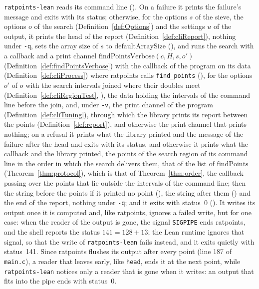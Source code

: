 \begin{definition}\label{def:cliRun}
  \leanok
  \verb|ratpoints-lean| reads its command line (). On a failure it prints
  the failure's message and exits with its status; otherwise, for the options $s$ of the sieve, the
  options $o$ of the search (Definition~\ref{def:Options}) and the settings $u$ of the output, it
  prints the head of the report (Definition~\ref{def:cliReport}), nothing under \verb|-q|, sets the
  array size of $s$ to $\mathrm{defaultArraySize}$ (), and runs the search
  with a callback and a print channel $\mathrm{findPointsVerbose}(c, H, s, o')$
  (Definition~\ref{def:findPointsVerbose}) with the callback of the program on its data
  (Definition~\ref{def:cliProcess}) where ratpoints calls \verb|find_points|
  (), for the options $o'$ of $o$ with the search intervals joined where
  their doubles meet (Definition~\ref{def:cliRegionTest}, ), the data
  holding the intervals of the command line before the join, and, under \verb|-v|, the print channel
  of the program (Definition~\ref{def:cliTuning}), through which the library prints its report
  between the points (Definition~\ref{def:report}), and otherwise the print channel that prints
  nothing; on a refusal it prints what the library printed and the message of the failure after the
  head and exits with its status, and otherwise it prints what the callback and the library printed,
  the points of the search region of its command line in the order in which the search delivers
  them, that of the list of $\mathrm{findPoints}$ (Theorem~\ref{thm:protocol}), which is that of
  Theorem~\ref{thm:order}, the callback passing over the points that lie outside the intervals of
  the command line; then the string before the points if it printed no point
  (), the string after them () and the end of
  the report, nothing under \verb|-q|; and it exits with status~0 (). It
  writes its output once it is computed and, like ratpoints, ignores a failed write, but for one
  case: when the reader of the output is gone, the signal \verb|SIGPIPE| ends ratpoints, and the
  shell reports the status $141 = 128 + 13$; the Lean runtime ignores that signal, so that the write
  of \verb|ratpoints-lean| fails instead, and it exits quietly with status~141. Since ratpoints
  flushes its output after every point (line 187 of \verb|main.c|), a reader that leaves early, like
  \verb|head|, ends it at the next point, while \verb|ratpoints-lean| notices only a reader that is
  gone when it writes: an output that fits into the pipe ends with status~0.
\end{definition}

